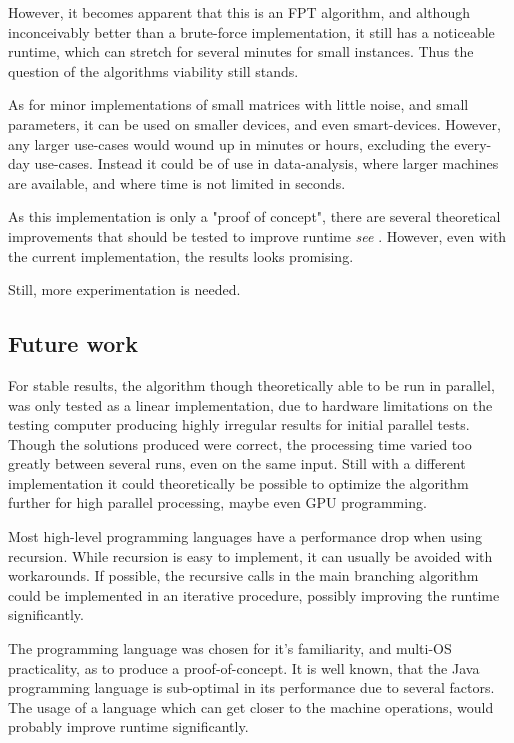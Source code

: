 \documentclass[a4paper]{article}
\begin{document}
However, it becomes apparent that this is an FPT algorithm, and although inconceivably better than a brute-force
implementation, it still has a noticeable runtime, which can stretch for several minutes for small instances. Thus the
question of the algorithms viability still stands.

As for minor implementations of small matrices with little noise, and small parameters, it can be used on smaller devices,
and even smart-devices. However, any larger use-cases would wound up in minutes or hours, excluding the every-day use-cases.
Instead it could be of use in data-analysis, where larger machines are available, and where time is not limited in seconds.

As this implementation is only a "proof of concept", there are several theoretical improvements that should be tested to improve
runtime \textit{see }. However, even with the current implementation, the results looks promising.

Still, more experimentation is needed.

\subsection{Future work}
\label{sec:future-work}
For stable results, the algorithm though theoretically able to be run in parallel, was only tested as a linear implementation,
due to hardware limitations on the testing computer producing highly irregular results for initial parallel tests.
Though the solutions produced were correct, the processing time varied too greatly between several runs, even on the same input.
Still with a different implementation it could theoretically be possible to optimize the algorithm further
for high parallel processing, maybe even GPU programming.

Most high-level programming languages have a performance drop when using recursion. While recursion is easy to implement, it can
usually be avoided with workarounds. If possible, the recursive calls in the main branching algorithm could be implemented
in an iterative procedure, possibly improving the runtime significantly.

The programming language was chosen for it's familiarity, and multi-OS practicality, as to produce a proof-of-concept.
It is well known, that the Java programming language is sub-optimal in its performance due to several
factors. The usage of a language which can get closer to the machine operations, would probably improve
runtime significantly.
\end{document}
